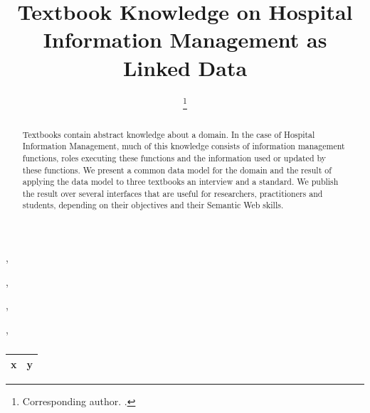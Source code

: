 \documentclass[sw]{iosart2x}
\begin{document}
\begin{frontmatter}

\title{Textbook Knowledge on Hospital Information Management as Linked Data}

\author[A]{ %
\thanks{Corresponding author. .}},
\author[A]{ },
\author[A]{ },
\author[A]{ },
\author[A]{ }
\address[A]{Institute for Medical Informatics, Statistics and Epidemiology (IMISE),
, }

\begin{abstract}
Textbooks contain abstract knowledge about a domain.
In the case of Hospital Information Management, much of this knowledge consists of information management functions, roles executing these functions  and the information used or updated by these functions.
We present a common data model for the domain and the result of applying the data model to three textbooks an interview and a standard.
We publish the result over several interfaces that are useful for researchers, practitioners and students, depending on their objectives and their Semantic Web skills.
\end{abstract}

\begin{keyword}
\end{keyword}

\end{frontmatter}

\begin{table}
\caption{}
\label{tab:namespaces}
\begin{tabular}{ll}
\toprule
\textbf{x}	&\textbf{y}\\
\midrule
\bottomrule
\end{tabular}
\end{table}
\end{document}
